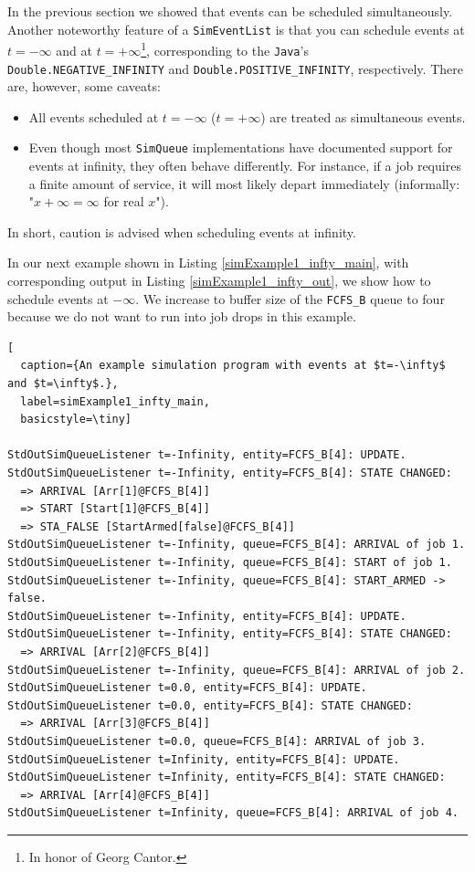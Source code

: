 \documentclass[12pt]{book}
\begin{document}
In the previous section we showed that
  events can be scheduled simultaneously.
Another noteworthy feature of a \lstinline|SimEventList|
  is that you can schedule events
  at $t=-\infty$ and at $t=+\infty$\footnote{
In honor of Georg Cantor.},
  corresponding to the \lstinline|Java|'s
  \lstinline|Double.NEGATIVE_INFINITY| and
  \lstinline|Double.POSITIVE_INFINITY|,
  respectively.
There are, however, some caveats:
\begin{itemize}
  \item All events scheduled at $t=-\infty$ ($t=+\infty$)
          are treated as simultaneous events.
  \item Even though most \lstinline|SimQueue|
          implementations have documented support
          for events at infinity,
          they often behave differently.
        For instance, if a job requires
          a finite amount of service,
          it will most likely depart immediately
          (informally: "$x + \infty = \infty$ for real $x$").
\end{itemize}
In short, caution is advised when scheduling events at infinity.

In our next example shown in Listing \ref{simExample1_infty_main},
  with corresponding output in Listing \ref{simExample1_infty_out},
  we show how to schedule events at $-\infty$.
We increase to buffer size of the \lstinline|FCFS_B| queue to four
  because we do not want to run into job drops in this example.
  
\begin{lstfloat}
\begin{lstlisting}[
  caption={An example simulation program with events at $t=-\infty$ and $t=\infty$.},
  label=simExample1_infty_main,
  basicstyle=\tiny]

StdOutSimQueueListener t=-Infinity, entity=FCFS_B[4]: UPDATE.
StdOutSimQueueListener t=-Infinity, entity=FCFS_B[4]: STATE CHANGED:
  => ARRIVAL [Arr[1]@FCFS_B[4]]
  => START [Start[1]@FCFS_B[4]]
  => STA_FALSE [StartArmed[false]@FCFS_B[4]]
StdOutSimQueueListener t=-Infinity, queue=FCFS_B[4]: ARRIVAL of job 1.
StdOutSimQueueListener t=-Infinity, queue=FCFS_B[4]: START of job 1.
StdOutSimQueueListener t=-Infinity, queue=FCFS_B[4]: START_ARMED -> false.
StdOutSimQueueListener t=-Infinity, entity=FCFS_B[4]: UPDATE.
StdOutSimQueueListener t=-Infinity, entity=FCFS_B[4]: STATE CHANGED:
  => ARRIVAL [Arr[2]@FCFS_B[4]]
StdOutSimQueueListener t=-Infinity, queue=FCFS_B[4]: ARRIVAL of job 2.
StdOutSimQueueListener t=0.0, entity=FCFS_B[4]: UPDATE.
StdOutSimQueueListener t=0.0, entity=FCFS_B[4]: STATE CHANGED:
  => ARRIVAL [Arr[3]@FCFS_B[4]]
StdOutSimQueueListener t=0.0, queue=FCFS_B[4]: ARRIVAL of job 3.
StdOutSimQueueListener t=Infinity, entity=FCFS_B[4]: UPDATE.
StdOutSimQueueListener t=Infinity, entity=FCFS_B[4]: STATE CHANGED:
  => ARRIVAL [Arr[4]@FCFS_B[4]]
StdOutSimQueueListener t=Infinity, queue=FCFS_B[4]: ARRIVAL of job 4.

\end{lstlisting}
\end{lstfloat}
\end{document}
